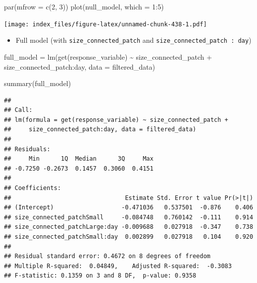 \documentclass[
]{article}
\newenvironment{Shaded}{\begin{snugshade}}{\end{snugshade}}
\newcommand{\AttributeTok}[1]{\textcolor[rgb]{0.77,0.63,0.00}{#1}}
\newcommand{\DecValTok}[1]{\textcolor[rgb]{0.00,0.00,0.81}{#1}}
\newcommand{\FunctionTok}[1]{\textcolor[rgb]{0.00,0.00,0.00}{#1}}
\newcommand{\NormalTok}[1]{#1}
\newcommand{\OtherTok}[1]{\textcolor[rgb]{0.56,0.35,0.01}{#1}}
\newcommand{\SpecialCharTok}[1]{\textcolor[rgb]{0.00,0.00,0.00}{#1}}
\providecommand{\tightlist}{%
  \setlength{\itemsep}{0pt}\setlength{\parskip}{0pt}}
\begin{document}
\begin{Shaded}
\begin{Highlighting}[]
\FunctionTok{par}\NormalTok{(}\AttributeTok{mfrow =} \FunctionTok{c}\NormalTok{(}\DecValTok{2}\NormalTok{, }\DecValTok{3}\NormalTok{))}
\FunctionTok{plot}\NormalTok{(null\_model, }\AttributeTok{which =} \DecValTok{1}\SpecialCharTok{:}\DecValTok{5}\NormalTok{)}
\end{Highlighting}
\end{Shaded}

\texttt{[image: index\_files/figure-latex/unnamed-chunk-438-1.pdf]}

\begin{itemize}
\tightlist
\item
  Full model (with \texttt{size\_connected\_patch} and
  \texttt{size\_connected\_patch\ :\ day})
\end{itemize}

\begin{Shaded}
\begin{Highlighting}[]
\NormalTok{full\_model }\OtherTok{=} \FunctionTok{lm}\NormalTok{(}\FunctionTok{get}\NormalTok{(response\_variable) }\SpecialCharTok{\textasciitilde{}}
\NormalTok{                  size\_connected\_patch }\SpecialCharTok{+}
\NormalTok{                  size\_connected\_patch}\SpecialCharTok{:}\NormalTok{day,}
                \AttributeTok{data =}\NormalTok{ filtered\_data)}

\FunctionTok{summary}\NormalTok{(full\_model)}
\end{Highlighting}
\end{Shaded}

\begin{verbatim}
## 
## Call:
## lm(formula = get(response_variable) ~ size_connected_patch + 
##     size_connected_patch:day, data = filtered_data)
## 
## Residuals:
##     Min      1Q  Median      3Q     Max 
## -0.7250 -0.2673  0.1457  0.3060  0.4151 
## 
## Coefficients:
##                                Estimate Std. Error t value Pr(>|t|)
## (Intercept)                   -0.471036   0.537501  -0.876    0.406
## size_connected_patchSmall     -0.084748   0.760142  -0.111    0.914
## size_connected_patchLarge:day -0.009688   0.027918  -0.347    0.738
## size_connected_patchSmall:day  0.002899   0.027918   0.104    0.920
## 
## Residual standard error: 0.4672 on 8 degrees of freedom
## Multiple R-squared:  0.04849,    Adjusted R-squared:  -0.3083 
## F-statistic: 0.1359 on 3 and 8 DF,  p-value: 0.9358
\end{verbatim}
\end{document}
